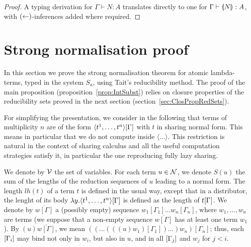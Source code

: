 \documentclass{llncs} %
\begin{document}
\begin{proof}
%
A typing derivation for $\Gamma \vdash N : A$ translates directly to one for $\Gamma\vdash {\llparenthesis{N}\rrparenthesis_{{}}} : A$, with $({\leftarrow})$-inferences added where required.
\end{proof}


\section{Strong normalisation proof}\label{sec:SNproof}

In this section we prove the strong normalisation theorem for atomic lambda-terms, typed in the system $S_a$,
using Tait's reducibility method. The proof of the main proposition (proposition~\ref{prop:IntSubst}) relies on closure properties of the reducibility sets proved in the next section (section~\ref{sec:ClosPropRedSets}).

For simplifying the presentation, we consider in the following that terms of multiplicity $n$ are of the form $\langle t^1,\dots, t^n \rangle\G$ with $t$ in sharing normal form. This means in particular that we do not compute inside $\langle ... \rangle$. This
restriction is  natural in the context of sharing calculus and all the useful computation strategies satisfy it, in particular the one reproducing fully lazy sharing.


We denote by $\mathcal{V}$ the set of variables.
For each term $u \in \mathcal{N}$, we denote $S(u)$ the sum of the lengths of the reduction sequences of $u$ leading to a normal form. The length $lh(t)$ of a term $t$ is defined in the usual way, except that in a distributor, the lenght of its body $\lambda y.\langle t^1,\dots, t^n \rangle\G$ is defined as the length of $t\G$.
We denote by $\overline{w[\Gamma]}$ a (possibly empty) sequence $w_1[\Gamma_1]\dots w_n[\Gamma_n]$, where $w_1,\dots ,w_n$ are terms (we suppose that a non-empty sequence  $\overline{w[\Gamma]}$ has at least one term $w_1$).
By $(u)\overline{w[\Gamma]}$, we mean $((...(((u)w_1)[\Gamma_1])\dots )w_n)[\Gamma_n]$; thus, each $\G[i]$ may bind not only in $w_i$, but also in $u$, and in all $\G[j]$ and $w_j$ for $j<i$.
\end{document}
